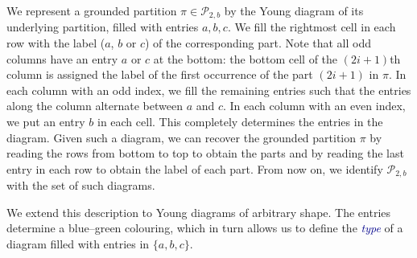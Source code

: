 \documentclass[11pt]{article}
\theoremstyle{definition}
\theoremstyle{remark}
\theoremstyle{definition}
\numberwithin{equation}{section}
\renewcommand\emph[1]{\textcolor{darkblue}{\it #1}}
\begin{document}
We represent a grounded partition \( \pi \in \mathcal{P}_{2,b} \) by
the Young diagram of its underlying partition, filled with entries
$a,b,c$. We fill the rightmost cell in each row with the label ($a$,
$b$ or $c$) of the corresponding part. Note that all odd columns have
an entry $a$ or $c$ at the bottom: the bottom cell of the
\( (2i+1) \)th column is assigned the label of the first occurrence of
the part \( (2i+1) \) in \( \pi \). In each column with an odd index,
we fill the remaining entries such that the entries along the column
alternate between \( a \) and \( c \). In each column with an even
index, we put an entry \( b \) in each cell. This completely
determines the entries in the diagram. Given such a diagram, we can
recover the grounded partition $\pi$ by reading the rows from bottom
to top to obtain the parts and by reading the last entry in each row
to obtain the label of each part. From now on, we identify
\( \mathcal{P}_{2,b} \) with the set of such diagrams.

We extend this description to Young diagrams of arbitrary shape. The
entries determine a blue--green colouring, which in turn allows us to
define the \emph{type} of a diagram filled with entries in
\(\{a,b,c\}\).
\end{document}
